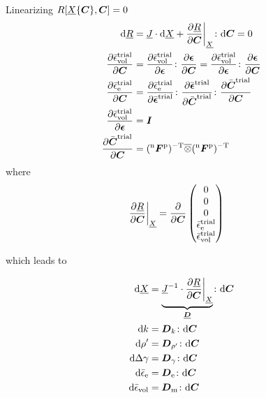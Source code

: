 \documentclass[a4paper,11pt]{article}
\newcommand{\ootimes}{\overline{\otimes}}
\newcommand{\ts}[1]{\text{\boldmath $#1$}}
\newcommand{\pderiv}[2]{\frac{\partial #1}{\partial #2}}
\newcommand{\vol}{{\rm vol}}
\newcommand{\trial}{{\rm trial}}
\newcommand{\rmd}{{\rm d}}
\newcommand{\rme}{{\rm e}}
\newcommand{\rmm}{{\rm m}}
\newcommand{\rmp}{{\rm p}}
\newcommand{\rmT}{{\rm T}}
\newcommand{\old}{{}^{\rm n}}
\begin{document}
Linearizing $R[\underline X\{\ts C\},\ts C] = 0$
\begin{align*}
	\rmd\underline R &= \underline J\cdot\rmd\underline X + \pderiv{\underline R}{\ts C}\bigg|_{\underline X}\colon\rmd\ts C = 0\\
	\pderiv{\bar{\epsilon}_\vol^\trial}{\ts C} &= \pderiv{\bar{\epsilon}_\vol^\trial}{\ts \epsilon}\colon\pderiv{\ts\epsilon}{\ts C} 
		= \pderiv{\bar{\epsilon}_\vol^\trial}{\ts \epsilon}\colon\pderiv{\ts\epsilon}{\ts C}\\
	\pderiv{\bar{\epsilon}_\rme^\trial}{\ts C} &= 
		\pderiv{\bar{\epsilon}_\rme^\trial}{\bar{\ts\epsilon}^\trial}\colon
		\pderiv{\bar{\ts\epsilon}^\trial}{\bar{\ts C}^\trial}\colon
		\pderiv{\bar{\ts C}^\trial}{\ts C}\\
	\pderiv{\bar{\epsilon}_\vol^\trial}{\ts \epsilon} &= \ts I\\
	\pderiv{\bar{\ts C}^\trial}{\ts C} &= (\old\ts F^\rmp)^{-\rmT}\ootimes(\old\ts F^\rmp)^{-\rmT}
\end{align*}
where 
\begin{align*}
	\pderiv{\underline R}{\ts C}\bigg|_{\underline X} &= \pderiv{}{\ts C}\begin{pmatrix}0\\0\\0\\ 
		\bar\epsilon_\rme^\trial\\
		\bar\epsilon_\vol^\trial\\
		\end{pmatrix}
\end{align*}

which leads to 

\begin{align*}
	\rmd\underline X &= \underbrace{\underline J^{-1}\cdot\pderiv{\underline R}{\ts C}\bigg|_{\underline X}}_{\underline{\ts D}}\colon\rmd\ts C\\
	\rmd k &= \ts D_k \colon\rmd\ts C\\
	\rmd\rho' &= \ts D_{\rho'} \colon\rmd\ts C\\
	\rmd\Delta\gamma &= \ts D_\gamma \colon\rmd\ts C\\
	\rmd\bar{\epsilon}_\rme &= \ts D_\rme \colon\rmd\ts C\\
	\rmd\bar{\epsilon}_\vol &= \ts D_\rmm \colon\rmd\ts C
\end{align*}
\end{document}
